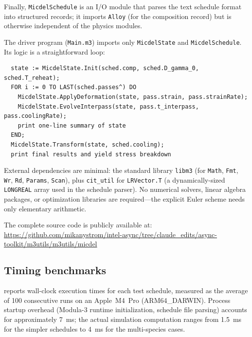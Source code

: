 \documentclass[11pt,a4paper]{article}
\begin{document}
\noindent Finally, \texttt{MicdelSchedule} is an I/O module that parses the
text schedule format into structured records; it imports \texttt{Alloy} (for
the composition record) but is otherwise independent of the physics modules.

The driver program (\texttt{Main.m3}) imports only \texttt{MicdelState} and
\texttt{MicdelSchedule}.  Its logic is a straightforward loop:
\begin{verbatim}
  state := MicdelState.Init(sched.comp, sched.D_gamma_0, sched.T_reheat);
  FOR i := 0 TO LAST(sched.passes^) DO
    MicdelState.ApplyDeformation(state, pass.strain, pass.strainRate);
    MicdelState.EvolveInterpass(state, pass.t_interpass, pass.coolingRate);
    print one-line summary of state
  END;
  MicdelState.Transform(state, sched.cooling);
  print final results and yield stress breakdown
\end{verbatim}

\noindent External dependencies are minimal: the standard library
\texttt{libm3} (for \texttt{Math}, \texttt{Fmt}, \texttt{Wr}, \texttt{Rd},
\texttt{Params}, \texttt{Scan}), plus \texttt{cit\_util} for
\texttt{LRVector.T} (a dynamically-sized \texttt{LONGREAL} array used in
the schedule parser).  No numerical solvers, linear algebra packages, or
optimization libraries are required---the explicit Euler scheme needs only
elementary arithmetic.

The complete source code is publicly available at:\\
\url{https://github.com/mikanystrom/intel-async/tree/claude_edits/async-toolkit/m3utils/m3utils/micdel}

\subsection{Timing benchmarks}
\label{sec:timing}

 reports wall-clock execution times for each test schedule,
measured as the average of 100 consecutive runs on an Apple~M4~Pro (ARM64\_DARWIN).
Process startup overhead (Modula-3 runtime initialization, schedule file
parsing) accounts for approximately \SI{7}{\milli\second}; the actual
simulation computation ranges from \SI{1.5}{\milli\second} for the simpler
schedules to \SI{4}{\milli\second} for the multi-species cases.
\end{document}
